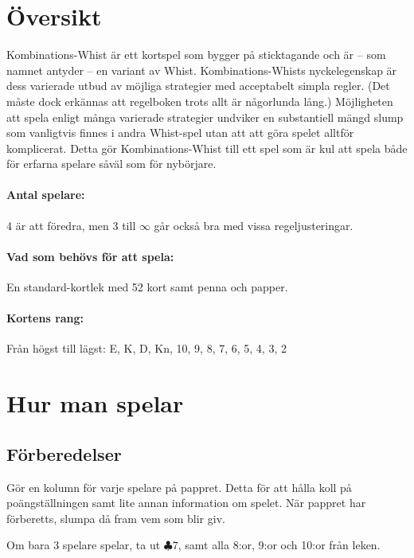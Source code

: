 \documentclass[a4paper]{article}
\author{Av Joakim Nilsson}
\date{Utvecklingsversion (baserad på version \varVersion-\varLanguage) -- \today}
\date{Version \varVersion-\varLanguage\ -- \today}
\begin{document}

	\introPages
	\pagebreak


	\section{Översikt}
		Kombinations-Whist är ett kortspel som bygger på sticktagande och är -- som namnet antyder -- en variant av Whist. Kombinations-Whists nyckelegenskap är dess varierade utbud av möjliga strategier med acceptabelt simpla regler. (Det måste dock erkännas att regelboken trots allt är någorlunda lång.) Möjligheten att spela enligt många varierade strategier undviker en substantiell mängd slump som vanligtvis finnes i andra Whist-spel utan att att göra spelet alltför komplicerat. Detta gör Kombinations-Whist till ett spel som är kul att spela både för erfarna spelare såväl som för nybörjare.

		\paragraph{Antal spelare:}
		4 är att föredra, men 3 till $\infty$ går också bra med vissa regeljusteringar.

		\paragraph{Vad som behövs för att spela:}
		En standard-kortlek med 52 kort samt penna och papper.

		\paragraph{Kortens rang:}
		Från högst till lägst: E, K, D, Kn, 10, 9, 8, 7, 6, 5, 4, 3, 2

	\section{Hur man spelar}
		\subsection{Förberedelser}
			Gör en kolumn för varje spelare på pappret. Detta för att hålla koll på poängställningen samt lite annan information om spelet. När pappret har förberetts, slumpa då fram vem som blir giv.

			Om bara 3 spelare spelar, ta ut $\clubsuit 7$, samt alla 8:or, 9:or och 10:or från leken.
\end{document}
